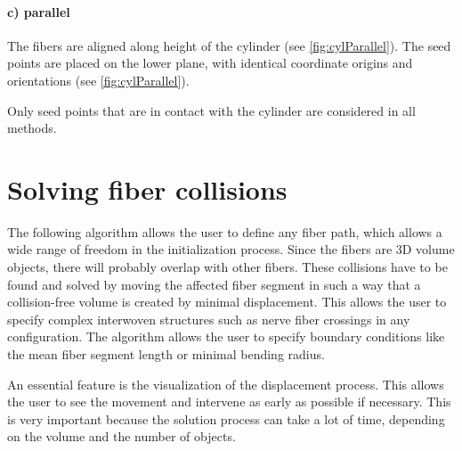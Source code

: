 \paragraph{c) parallel}
The fibers are aligned along height of the cylinder (see \cref{fig:cylParallel}).
The seed points are placed on the lower plane, with identical coordinate origins and orientations (see \cref{fig:cylParallel}).
%
\par
Only seed points that are in contact with the cylinder are considered in all methods.
%
%
\section{Solving fiber collisions}
\label{sec:Solver}
%
The following algorithm allows the user to define any fiber path, which allows a wide range of freedom in the initialization process.
Since the fibers are 3D volume objects, there will probably overlap with other fibers.
These collisions have to be found and solved by moving the affected fiber segment in such a way that a collision-free volume is created by minimal displacement.
This allows the user to specify complex interwoven structures such as nerve fiber crossings in any configuration.
The algorithm allows the user to specify boundary conditions like the mean fiber segment length or minimal bending radius.
\par
% 
An essential feature is the visualization of the displacement process.
This allows the user to see the movement and intervene as early as possible if necessary.
This is very important because the solution process can take a lot of time, depending on the volume and the number of objects.
%
%
% 
